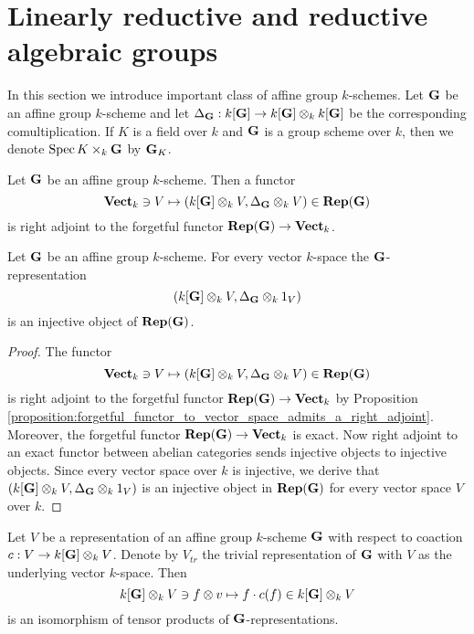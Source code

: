 \section{Linearly reductive and reductive algebraic groups}
\noindent
In this section we introduce important class of affine group $k$-schemes. Let $\mathbf{G}$ be an affine group $k$-scheme and let $\Delta_{\mathbf{G}}:k[\mathbf{G}]\rightarrow k[\mathbf{G}]\otimes_kk[\mathbf{G}]$ be the corresponding comultiplication. If $K$ is a field over $k$ and $\mathbf{G}$ is a group scheme over $k$, then we denote $\mathrm{Spec}\, K\times_k \mathbf{G}$ by $\mathbf{G}_K$.

\begin{proposition}\label{proposition:forgetful_functor_to_vector_space_admits_a_right_adjoint}
Let $\mathbf{G}$ be an affine group $k$-scheme. Then a functor
$$\mathbf{Vect}_k \ni V\mapsto \left(k[\mathbf{G}]\otimes_kV,\Delta_{\mathbf{G}}\otimes_k V \right)\in \mathbf{Rep}(\mathbf{G})$$
is right adjoint to the forgetful functor $\mathbf{Rep}(\mathbf{G})\rightarrow \mathbf{Vect}_k$.
\end{proposition}

\begin{corollary}\label{corollary:canonical_injective_objects_in_representations_of_groups}
Let $\mathbf{G}$ be an affine group $k$-scheme. For every vector $k$-space the $\mathbf{G}$-representation
$$\left(k[\mathbf{G}]\otimes_kV,\Delta_{\mathbf{G}}\otimes_k1_V\right)$$
is an injective object of $\mathbf{Rep}(\mathbf{G})$.
\end{corollary}
\begin{proof}
The functor
$$\mathbf{Vect}_k \ni V\mapsto \left(k[\mathbf{G}]\otimes_kV,\Delta_{\mathbf{G}}\otimes_k V \right)\in \mathbf{Rep}(\mathbf{G})$$
is right adjoint to the forgetful functor $\mathbf{Rep}(\mathbf{G})\rightarrow \mathbf{Vect}_k$ by Proposition \ref{proposition:forgetful_functor_to_vector_space_admits_a_right_adjoint}. Moreover, the forgetful functor $\mathbf{Rep}(\mathbf{G})\rightarrow \mathbf{Vect}_k$ is exact. Now right adjoint to an exact functor between abelian categories sends injective objects to injective objects. Since every vector space over $k$ is injective, we derive that $\left(k[\mathbf{G}]\otimes_kV,\Delta_{\mathbf{G}}\otimes_k1_V\right)$ is an injective object in $\mathbf{Rep}(\mathbf{G})$ for every vector space $V$ over $k$.
\end{proof}

\begin{proposition}\label{proposition:tensor_products_of_representations_and_its_trivial_version_with_regular_representation_are_isomorphic}
Let $V$ be a representation of an affine group $k$-scheme $\mathbf{G}$ with respect to coaction $c:V\rightarrow k[\mathbf{G}]\otimes_kV$. Denote by $V_{tr}$ the trivial representation of $\mathbf{G}$ with $V$ as the underlying vector $k$-space. Then
$$k[\mathbf{G}]\otimes_kV \ni f\otimes v \mapsto f\cdot c(f) \in k[\mathbf{G}]\otimes_kV$$
is an isomorphism of tensor products of $\mathbf{G}$-representations.
\end{proposition}

